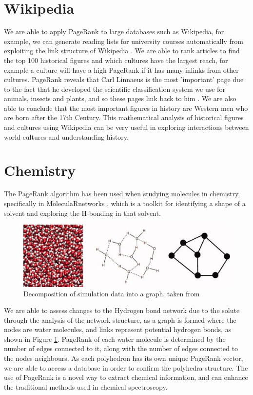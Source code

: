 \documentclass[11pt]{report}
\begin{document}
\section{Wikipedia}
We are able to apply PageRank to large databases such as Wikipedia, for example, we can generate reading lists for university courses automatically from exploiting the link structure of Wikipedia \cite{wissner2006preparation}. We are able to rank articles to find the top 100 historical figures and which cultures have the largest reach, for example a culture will have a high PageRank if it has many inlinks from other cultures. PageRank reveals that Carl Linnaeus is the most 'important' page due to the fact that he developed the scientific classification system we use for animals, insects and plants, and so these pages link back to him \cite{eom2015interactions}. We are also able to conclude that the most important figures in history are Western men who are born after the 17th Century. This mathematical analysis of historical figures and cultures using Wikipedia can be very useful in exploring interactions between world cultures and understanding history.


\section{Chemistry}
The PageRank algorithm has been used when studying molecules in chemistry, specifically in MoleculaRnetworks \cite{JCC:JCC22917}, which is a toolkit for identifying a shape of a solvent and exploring the H-bonding in that solvent. 
\begin{figure}
\includegraphics[width=\linewidth]{Decomposition_of_simulation_date_into_a_graph_-chem.jpg}
\caption{Decomposition of simulation data into a graph, taken from \cite{JCC:JCC22917}}
\label{fig:chem}
\end{figure}
We are able to assess changes to the Hydrogen bond network due to the solute through the analysis of the network structure, as a graph is formed where the nodes are water molecules, and links represent potential hydrogen bonds, as shown in Figure \ref{fig:chem}. PageRank of each water molecule is determined by the number of edges connected to it, along with the number of edges connected to the nodes neighbours. As each polyhedron has its own unique PageRank vector, we are able to access a database in order to confirm the polyhedra structure. The use of PageRank is a novel way to extract chemical information, and can enhance the traditional methods used in chemical spectroscopy.
\end{document}
